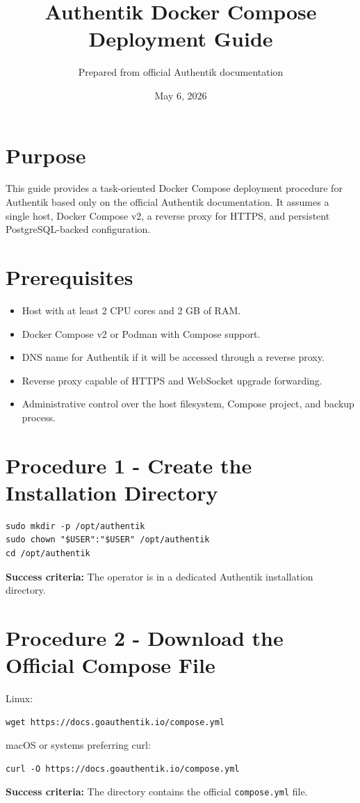 \documentclass[11pt]{article}
\title{Authentik Docker Compose Deployment Guide}\author{Prepared from official Authentik documentation}\date{May 6, 2026}
\newcommand{\ok}{\textbf{Success criteria:} }
\begin{document}
\maketitle

\section*{Purpose}
This guide provides a task-oriented Docker Compose deployment procedure for Authentik based only on the official Authentik documentation. It assumes a single host, Docker Compose v2, a reverse proxy for HTTPS, and persistent PostgreSQL-backed configuration.

\section*{Prerequisites}
\begin{itemize}
\item Host with at least 2 CPU cores and 2 GB of RAM.
\item Docker Compose v2 or Podman with Compose support.
\item DNS name for Authentik if it will be accessed through a reverse proxy.
\item Reverse proxy capable of HTTPS and WebSocket upgrade forwarding.
\item Administrative control over the host filesystem, Compose project, and backup process.
\end{itemize}

\section*{Procedure 1 - Create the Installation Directory}
\begin{verbatim}
sudo mkdir -p /opt/authentik
sudo chown "$USER":"$USER" /opt/authentik
cd /opt/authentik
\end{verbatim}
\ok The operator is in a dedicated Authentik installation directory.

\section*{Procedure 2 - Download the Official Compose File}
Linux:
\begin{verbatim}
wget https://docs.goauthentik.io/compose.yml
\end{verbatim}
macOS or systems preferring curl:
\begin{verbatim}
curl -O https://docs.goauthentik.io/compose.yml
\end{verbatim}
\ok The directory contains the official \texttt{compose.yml} file.
\end{document}
